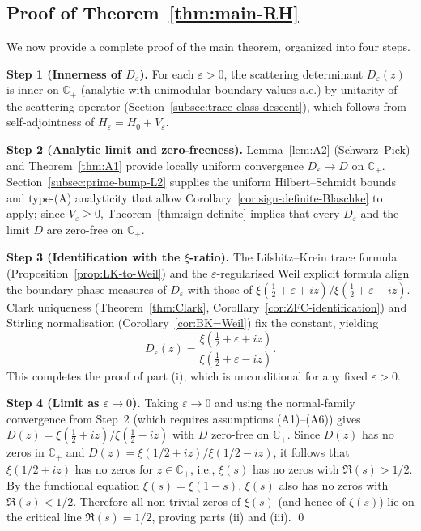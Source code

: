 ﻿\documentclass[12pt,a4paper]{article}
\theoremstyle{definition}
\theoremstyle{remark}
\newcommand{\CC}{\mathbb{C}}
\begin{document}
\subsection{Proof of Theorem~\ref{thm:main-RH}}

We now provide a complete proof of the main theorem, organized into four steps.

\textbf{Step 1 (Innerness of $D_\varepsilon$).} For each $\varepsilon>0$, the scattering determinant $D_\varepsilon(z)$ is inner on $\CC_+$ (analytic with unimodular boundary values a.e.) by unitarity of the scattering operator (Section~\ref{subsec:trace-class-descent}), which follows from self-adjointness of $H_\varepsilon = H_0 + V_\varepsilon$.

\textbf{Step 2 (Analytic limit and zero-freeness).} Lemma~\ref{lem:A2} (Schwarz--Pick) and Theorem~\ref{thm:A1} provide locally uniform convergence $D_\varepsilon\to D$ on $\CC_+$. Section~\ref{subsec:prime-bump-L2} supplies the uniform Hilbert--Schmidt bounds and type-(A) analyticity that allow Corollary~\ref{cor:sign-definite-Blaschke} to apply; since $V_\varepsilon\ge0$, Theorem~\ref{thm:sign-definite} implies that every $D_\varepsilon$ and the limit $D$ are zero-free on $\CC_+$.

\textbf{Step 3 (Identification with the $\xi$-ratio).} The Lifshitz--Krein trace formula (Proposition~\ref{prop:LK-to-Weil}) and the $\varepsilon$-regularised Weil explicit formula align the boundary phase measures of $D_\varepsilon$ with those of $\xi(\tfrac{1}{2}+\varepsilon+iz)/\xi(\tfrac{1}{2}+\varepsilon-iz)$. Clark uniqueness (Theorem~\ref{thm:Clark}, Corollary~\ref{cor:ZFC-identification}) and Stirling normalisation (Corollary~\ref{cor:BK=Weil}) fix the constant, yielding
\[
  D_\varepsilon(z) = \frac{\xi(\tfrac{1}{2}+\varepsilon+iz)}{\xi(\tfrac{1}{2}+\varepsilon-iz)}.
\]
This completes the proof of part (i), which is unconditional for any fixed $\varepsilon > 0$.

\textbf{Step 4 (Limit as $\varepsilon\to0$).} Taking $\varepsilon\to0$ and using the normal-family convergence from Step~2 (which requires assumptions (A1)--(A6)) gives $D(z)=\xi(\tfrac12+iz)/\xi(\tfrac12-iz)$ with $D$ zero-free on $\CC_+$. Since $D(z)$ has no zeros in $\CC_+$ and $D(z) = \xi(1/2+iz)/\xi(1/2-iz)$, it follows that $\xi(1/2+iz)$ has no zeros for $z \in \CC_+$, i.e., $\xi(s)$ has no zeros with $\Re(s) > 1/2$. By the functional equation $\xi(s) = \xi(1-s)$, $\xi(s)$ also has no zeros with $\Re(s) < 1/2$. Therefore all non-trivial zeros of $\xi(s)$ (and hence of $\zeta(s)$) lie on the critical line $\Re(s) = 1/2$, proving parts (ii) and (iii). \qed
\end{document}
